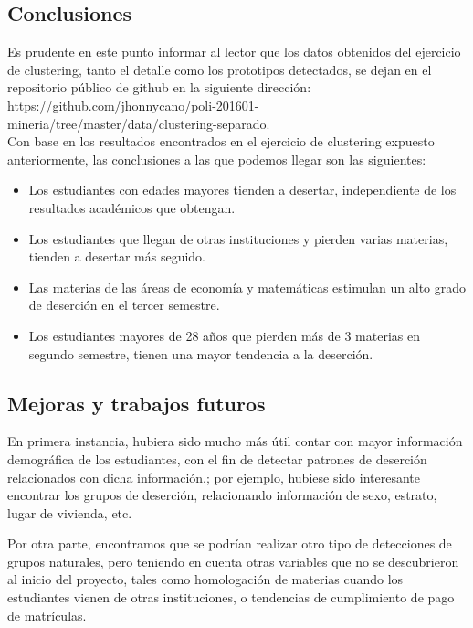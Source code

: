 \documentclass[fleqn,10pt]{SelfArx} %
\begin{document}
\subsection{Conclusiones}

Es prudente en este punto informar al lector que los datos obtenidos del ejercicio de clustering, tanto el detalle como los prototipos detectados, se dejan en el repositorio público de github en la siguiente dirección:\\

https://github.com/jhonnycano/poli-201601-mineria/tree/master/data/clustering-separado.
\\

Con base en los resultados encontrados en el ejercicio de clustering expuesto anteriormente, las conclusiones a las que podemos llegar son las siguientes:

\begin{itemize}
	\item Los estudiantes con edades mayores tienden a desertar, independiente de los resultados académicos que obtengan.
	\item Los estudiantes que llegan de otras instituciones y pierden varias materias, tienden a desertar más seguido.
	\item Las materias de las áreas de economía y matemáticas estimulan un alto grado de deserción en el tercer semestre.
	\item Los estudiantes mayores de 28 años que pierden más de 3 materias en segundo semestre, tienen una mayor tendencia a la deserción.
\end{itemize}

\subsection{Mejoras y trabajos futuros}

En primera instancia, hubiera sido mucho más útil contar con mayor información demográfica de los estudiantes, con el fin de detectar patrones de deserción relacionados con dicha información.; por ejemplo, hubiese sido interesante encontrar los grupos de deserción, relacionando información de sexo, estrato, lugar de vivienda, etc.

Por otra parte, encontramos que se podrían realizar otro tipo de detecciones de grupos naturales, pero teniendo en cuenta otras variables que no se descubrieron al inicio del proyecto, tales como homologación de materias cuando los estudiantes vienen de otras instituciones, o tendencias de cumplimiento de pago de matrículas.






\end{document}

